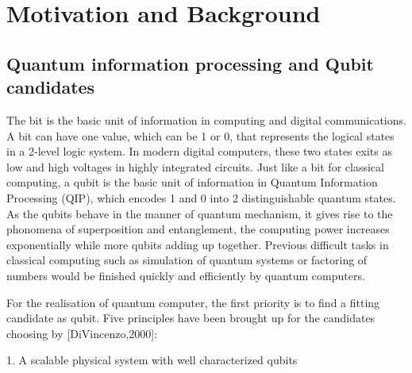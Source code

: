 
\chapter[Motivation and Background]
{Motivation and Background} %

\label{Chapter1} %







\newcommand{\keyword}[1]{\textbf{#1}}
\newcommand{\tabhead}[1]{\textbf{#1}}
\newcommand{\code}[1]{\texttt{#1}}
\newcommand{\file}[1]{\texttt{\bfseries#1}}
\newcommand{\option}[1]{\texttt{\itshape#1}}


\section[Quantum information processing and Qubit candidates]{Quantum information processing and Qubit candidates}

The bit is the basic unit of information in computing and digital communications. A bit can have one value, which can be 1 or 0, that represents the logical states in a 2-level logic system. In modern digital computers, these two states exits as low and high voltages in highly integrated circuits. Just like a bit for classical computing, a qubit is the basic unit of information in Quantum Information Processing (QIP), which encodes 1 and 0 into 2 distinguishable quantum states. As the qubits behave in the manner of quantum mechanism, it gives rise to the phonomena of superposition and entanglement, the computing power increases exponentially while more qubits adding up together. Previous difficult tasks in classical computing such as simulation of quantum systems or factoring of numbers would be finished quickly and efficiently by quantum computers.

For the realisation of quantum computer,  the first priority is to find a fitting candidate as qubit. Five principles have been brought up for the candidates choosing by [DiVincenzo,2000]:

1. A scalable physical system with well characterized qubits

